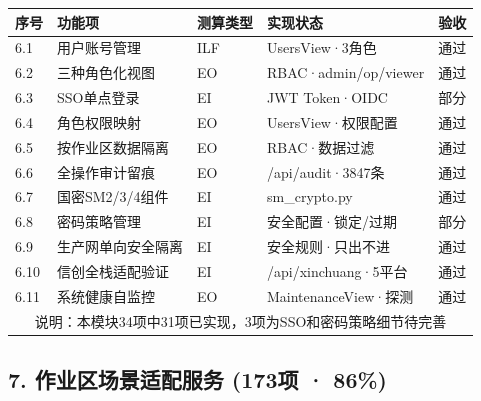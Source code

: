 \documentclass[11pt,a4paper]{ctexart}
\begin{document}
\begin{longtable}{p{1cm}p{4cm}p{3cm}p{3cm}p{2.5cm}}
\toprule
\textbf{序号} & \textbf{功能项} & \textbf{测算类型} & \textbf{实现状态} & \textbf{验收} \\
\midrule
6.1 & 用户账号管理 & ILF & UsersView·3角色 & \color{ok}通过 \\
6.2 & 三种角色化视图 & EO & RBAC·admin/op/viewer & \color{ok}通过 \\
6.3 & SSO单点登录 & EI & JWT Token·OIDC & \color{warn}部分 \\
6.4 & 角色权限映射 & EO & UsersView·权限配置 & \color{ok}通过 \\
6.5 & 按作业区数据隔离 & EO & RBAC·数据过滤 & \color{ok}通过 \\
6.6 & 全操作审计留痕 & EO & /api/audit·3847条 & \color{ok}通过 \\
6.7 & 国密SM2/3/4组件 & EI & sm\_crypto.py & \color{ok}通过 \\
6.8 & 密码策略管理 & EI & 安全配置·锁定/过期 & \color{warn}部分 \\
6.9 & 生产网单向安全隔离 & EI & 安全规则·只出不进 & \color{ok}通过 \\
6.10 & 信创全栈适配验证 & EI & /api/xinchuang·5平台 & \color{ok}通过 \\
6.11 & 系统健康自监控 & EO & MaintenanceView·探测 & \color{ok}通过 \\
\midrule
\multicolumn{5}{c}{说明：本模块34项中31项已实现，3项为SSO和密码策略细节待完善} \\
\bottomrule
\end{longtable}

\subsection{7. 作业区场景适配服务 (173项 · 86\%)}
\end{document}
